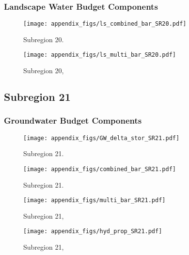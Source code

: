 \subsubsection{Landscape Water Budget Components}
\begin{figure}[ht]
\centerline{\texttt{[image: appendix\_figs/ls\_combined\_bar\_SR20.pdf]}}
\caption{\LSCombinedTextOne Subregion 20.\LSCombinedTextTwo}
\label{fig:LS_budget_SR20}
\end{figure}
\newpage

\begin{landscape}
\begin{figure}[ht]
\centerline{\texttt{[image: appendix\_figs/ls\_multi\_bar\_SR20.pdf]}}
\caption{\LSMultiTextOne Subregion 20,\LSMultiTextTwo}
\label{fig:multi_LS_budget_SR20}
\end{figure}
\newpage
\end{landscape}

\subsection{Subregion 21}
\subsubsection{Groundwater Budget Components}
\begin{figure}[h]
\centerline{\texttt{[image: appendix\_figs/GW\_delta\_stor\_SR21.pdf]}}
\caption{\GWBudgetText Subregion 21.}
\label{fig:delta_stor_SR21}
\end{figure}
\newpage

\begin{figure}[ht]
\centerline{\texttt{[image: appendix\_figs/combined\_bar\_SR21.pdf]}}
\caption{\GWCombinedTextOne Subregion 21.\GWCombinedTextTwo}
\label{fig:GW_budget_SR21}
\end{figure}
\newpage

\begin{landscape}
\begin{figure}[ht]
\centerline{\texttt{[image: appendix\_figs/multi\_bar\_SR21.pdf]}}
\caption{\GWMultiTextOne Subregion 21,\GWMultiTextTwo}
\label{fig:multi_GW_budget_SR21}
\end{figure}
\newpage

\begin{figure}[ht]
\centerline{\texttt{[image: appendix\_figs/hyd\_prop\_SR21.pdf]}}
\caption{\HydPropOne Subregion 21,\HydPropTwo}
\label{fig:hyd_prop_SR21}
\end{figure}
\newpage
\end{landscape}

